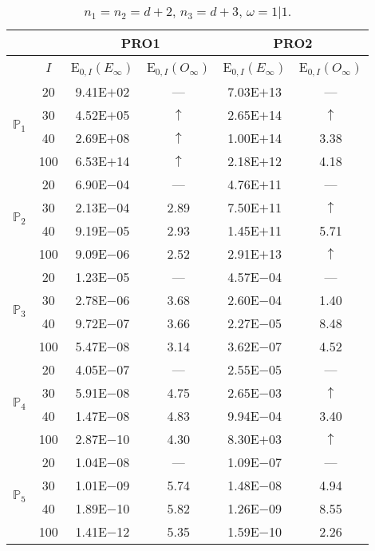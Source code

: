 \begin{table}[H]
\caption{$n_1=n_2=d+2$, $n_3=d+3$, $\omega=1|1$.}
\setlength{\tabcolsep}{5pt}
\centering
\begin{tabular}{@{}l c c c c c@{}}
\toprule
 &  & \multicolumn{2}{c}{PRO1} & \multicolumn{2}{c}{PRO2}\\
\midrule
 & $I$ & E$_{0,I}(E_{\infty})$ & E$_{0,I}(O_{\infty})$ & E$_{0,I}(E_{\infty})$ & E$_{0,I}(O_{\infty})$\\
\midrule
\multirow{4}{*}{$\mathbb{P}_{1}$}
 & 20 & 9.41E$+$02 & --- & 7.03E$+$13 & ---\\
 & 30 & 4.52E$+$05 & $\uparrow$ & 2.65E$+$14 & $\uparrow$ \\
 & 40 & 2.69E$+$08 & $\uparrow$ & 1.00E$+$14 & 3.38 \\
 & 100 & 6.53E$+$14 & $\uparrow$ & 2.18E$+$12 & 4.18 \\
\midrule
\multirow{4}{*}{$\mathbb{P}_{2}$}
 & 20 & 6.90E$-$04 & --- & 4.76E$+$11 & ---\\
 & 30 & 2.13E$-$04 & 2.89 & 7.50E$+$11 & $\uparrow$ \\
 & 40 & 9.19E$-$05 & 2.93 & 1.45E$+$11 & 5.71 \\
 & 100 & 9.09E$-$06 & 2.52 & 2.91E$+$13 & $\uparrow$ \\
\midrule
\multirow{4}{*}{$\mathbb{P}_{3}$}
 & 20 & 1.23E$-$05 & --- & 4.57E$-$04 & ---\\
 & 30 & 2.78E$-$06 & 3.68 & 2.60E$-$04 & 1.40 \\
 & 40 & 9.72E$-$07 & 3.66 & 2.27E$-$05 & 8.48 \\
 & 100 & 5.47E$-$08 & 3.14 & 3.62E$-$07 & 4.52 \\
\midrule
\multirow{4}{*}{$\mathbb{P}_{4}$}
 & 20 & 4.05E$-$07 & --- & 2.55E$-$05 & ---\\
 & 30 & 5.91E$-$08 & 4.75 & 2.65E$-$03 & $\uparrow$ \\
 & 40 & 1.47E$-$08 & 4.83 & 9.94E$-$04 & 3.40 \\
 & 100 & 2.87E$-$10 & 4.30 & 8.30E$+$03 & $\uparrow$ \\
\midrule
\multirow{4}{*}{$\mathbb{P}_{5}$}
 & 20 & 1.04E$-$08 & --- & 1.09E$-$07 & ---\\
 & 30 & 1.01E$-$09 & 5.74 & 1.48E$-$08 & 4.94 \\
 & 40 & 1.89E$-$10 & 5.82 & 1.26E$-$09 & 8.55 \\
 & 100 & 1.41E$-$12 & 5.35 & 1.59E$-$10 & 2.26 \\
\bottomrule
\end{tabular}
\label{Table:PRO:Rodrigo:Test15}
\end{table}

